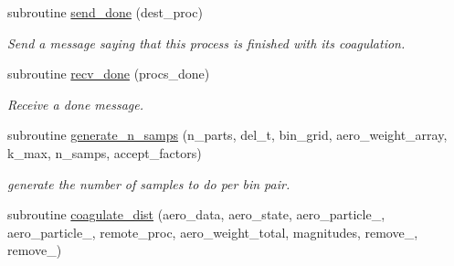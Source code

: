 \begin{DoxyCompactItemize}
\item 
subroutine \mbox{\hyperlink{namespacepmc__coagulation__dist_a1e9943ac016e1a33aea378a2c03475c2}{send\+\_\+done}} (dest\+\_\+proc)
\begin{DoxyCompactList}\small\item\em Send a message saying that this process is finished with its coagulation. \end{DoxyCompactList}\item 
subroutine \mbox{\hyperlink{namespacepmc__coagulation__dist_aabf7ad0c151fc3f2bd7f9adad6791cc2}{recv\+\_\+done}} (procs\+\_\+done)
\begin{DoxyCompactList}\small\item\em Receive a done message. \end{DoxyCompactList}\item 
subroutine \mbox{\hyperlink{namespacepmc__coagulation__dist_a8a5dfc3b2ce4151e0b4010978fa5afa1}{generate\+\_\+n\+\_\+samps}} (n\+\_\+parts, del\+\_\+t, bin\+\_\+grid, aero\+\_\+weight\+\_\+array, k\+\_\+max, n\+\_\+samps, accept\+\_\+factors)
\begin{DoxyCompactList}\small\item\em generate the number of samples to do per bin pair. \end{DoxyCompactList}\item 
subroutine \mbox{\hyperlink{namespacepmc__coagulation__dist_a08afcc602f062f98712051fc31d30527}{coagulate\+\_\+dist}} (aero\+\_\+data, aero\+\_\+state, aero\+\_\+particle\+\_, aero\+\_\+particle\+\_, remote\+\_\+proc, aero\+\_\+weight\+\_\+total, magnitudes, remove\+\_, remove\+\_)
\end{DoxyCompactItemize}
